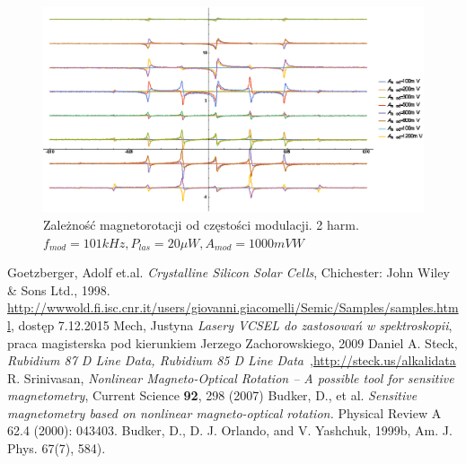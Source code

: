 \documentclass[a4paper,10pt]{article}
\begin{document}
\begin{figure}[h!]
\centering
 \includegraphics[width=\textwidth]{panoramy_2H_odam.eps}
 \caption{Zależność magnetorotacji od częstości modulacji. 2 harm. $f_{mod}=101kHz, P_{las}=20 \mu W, A_{mod}=1000mV W$}
 \label{fig:panodam2}
\end{figure}



\begin{thebibliography}{99}
 Goetzberger, Adolf et.al. \emph{Crystalline Silicon Solar Cells}, Chichester: John Wiley \& Sons Ltd., 1998.
 \url{http://wwwold.fi.isc.cnr.it/users/giovanni.giacomelli/Semic/Samples/samples.html}, dostęp 7.12.2015
  Mech, Justyna \emph{Lasery VCSEL do zastosowań w spektroskopii}, praca magisterska pod kierunkiem Jerzego Zachorowskiego, 2009
 Daniel A. Steck, \emph{Rubidium 87 D Line Data, Rubidium 85 D Line Data}~,\url{http://steck.us/alkalidata}
 R. Srinivasan,\textit{ Nonlinear Magneto-Optical Rotation – A possible tool for sensitive magnetometry}, Current Science \textbf{92}, 298 (2007)
 Budker, D., et al. \emph{Sensitive magnetometry based on nonlinear magneto-optical rotation.} Physical Review A 62.4 (2000): 043403.
 Budker, D., D. J. Orlando, and V. Yashchuk, 1999b, Am. J. Phys. 67(7), 584).

\end{thebibliography}
\end{document}
